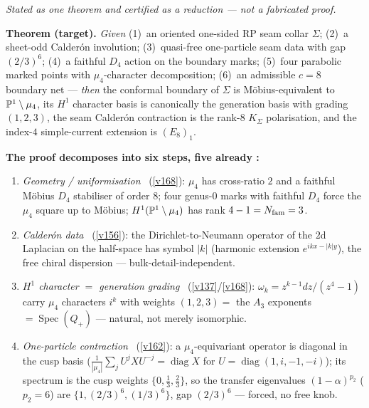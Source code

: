 \begin{keybox}
\emph{Stated as one theorem and certified as a reduction --- not a fabricated proof.}
\par\smallskip\noindent\textbf{Theorem (target).} \emph{Given} (1)~an oriented one-sided RP seam
collar $\Sigma$; (2)~a sheet-odd Calder\'on involution; (3)~quasi-free one-particle seam data with
gap $(2/3)^6$; (4)~a faithful $D_4$ action on the boundary marks; (5)~four parabolic marked points
with $\mu_4$-character decomposition; (6)~an admissible $c{=}8$ boundary net --- \emph{then} the
conformal boundary of $\Sigma$ is M\"obius-equivalent to $\mathbb P^1\setminus\mu_4$, its $H^1$ character
basis is canonically the generation basis with grading $(1,2,3)$, the seam Calder\'on contraction is
the rank-$8$ $K_\Sigma$ polarisation, and the index-$4$ simple-current extension is $(E_8)_1$.
\par\smallskip\noindent\textbf{The proof decomposes into six steps, five already \mE:}
\begin{enumerate}[leftmargin=2.2em,itemsep=1pt]
\item[\textbf{1--2}] \emph{Geometry / uniformisation} \mE\ (\vref{v168}): $\mu_4$ has cross-ratio $2$
  and a faithful M\"obius $D_4$ stabiliser of order $8$; four genus-$0$ marks with faithful $D_4$
  force the $\mu_4$ square up to M\"obius; $H^1(\mathbb P^1\setminus\mu_4)$ has rank $4-1=N_{\mathrm{fam}}=3$.
\item[\textbf{3}] \emph{Calder\'on data} \mE\ (\vref{v156}): the Dirichlet-to-Neumann operator of the
  $2$d Laplacian on the half-space has symbol $|k|$ (harmonic extension $e^{ikx-|k|y}$), the free
  chiral dispersion --- bulk-detail-independent.
\item[\textbf{4}] \emph{$H^1$ character $=$ generation grading} \mE\ (\vref{v137}/\vref{v168}):
  $\omega_k=z^{k-1}dz/(z^4-1)$ carry $\mu_4$ characters $i^k$ with weights $(1,2,3)=$ the $A_3$
  exponents $=\operatorname{Spec}(Q_+)$ --- natural, not merely isomorphic.
\item[\textbf{5}] \emph{One-particle contraction} \mE\ (\vref{v162}): a $\mu_4$-equivariant operator
  is diagonal in the cusp basis ($\tfrac1{|\mu_4|}\sum_j U^jXU^{-j}=\operatorname{diag}X$ for
  $U=\operatorname{diag}(1,i,-1,-i)$); its spectrum is the cusp weights $\{0,\tfrac13,\tfrac23\}$, so
  the transfer eigenvalues $(1-\alpha)^{p_2}$ ($p_2{=}6$) are $\{1,(2/3)^6,(1/3)^6\}$, gap $(2/3)^6$
  --- forced, no free knob.

\end{enumerate}
\end{keybox}
